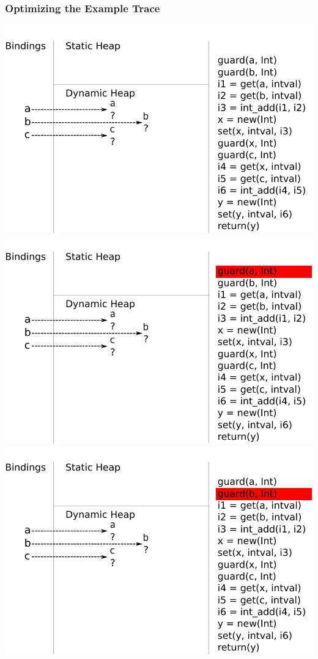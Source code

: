 \documentclass[utf8x]{beamer}
\begin{document}
\begin{frame}[plain]
    \frametitle{Optimizing the Example Trace}
{\includegraphics[scale=0.8]{figures/ex00}}
{\includegraphics[scale=0.8]{figures/ex01}}
{\includegraphics[scale=0.8]{figures/ex02}}

\end{frame}
\end{document}
